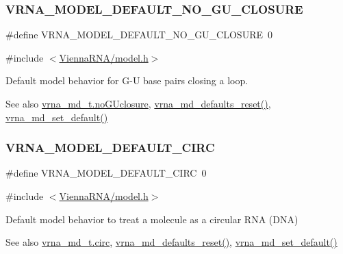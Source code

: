 \subsubsection{\texorpdfstring{VRNA\_MODEL\_DEFAULT\_NO\_GU\_CLOSURE}{VRNA\_MODEL\_DEFAULT\_NO\_GU\_CLOSURE}}
{\footnotesize\ttfamily \#define V\+R\+N\+A\+\_\+\+M\+O\+D\+E\+L\+\_\+\+D\+E\+F\+A\+U\+L\+T\+\_\+\+N\+O\+\_\+\+G\+U\+\_\+\+C\+L\+O\+S\+U\+RE~0}



{\ttfamily \#include $<$\mbox{\hyperlink{model_8h}{Vienna\+R\+N\+A/model.\+h}}$>$}



Default model behavior for G-\/U base pairs closing a loop. 

\begin{DoxySeeAlso}{See also}
\mbox{\hyperlink{group__model__details_a7e883db1f33f8f3baa5c9b140350c78e}{vrna\+\_\+md\+\_\+t.\+no\+G\+Uclosure}}, \mbox{\hyperlink{group__model__details_ga70834424cf804d149937de89f80ceb45}{vrna\+\_\+md\+\_\+defaults\+\_\+reset()}}, \mbox{\hyperlink{group__model__details_ga8ac6ff84936282436f822644bf841f66}{vrna\+\_\+md\+\_\+set\+\_\+default()}} 
\end{DoxySeeAlso}
\mbox{\label{group__model__details_ga22059033db7bcd875c51fec32425490a}} 
\subsubsection{\texorpdfstring{VRNA\_MODEL\_DEFAULT\_CIRC}{VRNA\_MODEL\_DEFAULT\_CIRC}}
{\footnotesize\ttfamily \#define V\+R\+N\+A\+\_\+\+M\+O\+D\+E\+L\+\_\+\+D\+E\+F\+A\+U\+L\+T\+\_\+\+C\+I\+RC~0}



{\ttfamily \#include $<$\mbox{\hyperlink{model_8h}{Vienna\+R\+N\+A/model.\+h}}$>$}



Default model behavior to treat a molecule as a circular R\+NA (D\+NA) 

\begin{DoxySeeAlso}{See also}
\mbox{\hyperlink{group__model__details_a92762e1008503d4623ff5c01e358a464}{vrna\+\_\+md\+\_\+t.\+circ}}, \mbox{\hyperlink{group__model__details_ga70834424cf804d149937de89f80ceb45}{vrna\+\_\+md\+\_\+defaults\+\_\+reset()}}, \mbox{\hyperlink{group__model__details_ga8ac6ff84936282436f822644bf841f66}{vrna\+\_\+md\+\_\+set\+\_\+default()}} 
\end{DoxySeeAlso}
\mbox{\label{group__model__details_ga793ed812e86f43799b14b2deee917f23}} 

